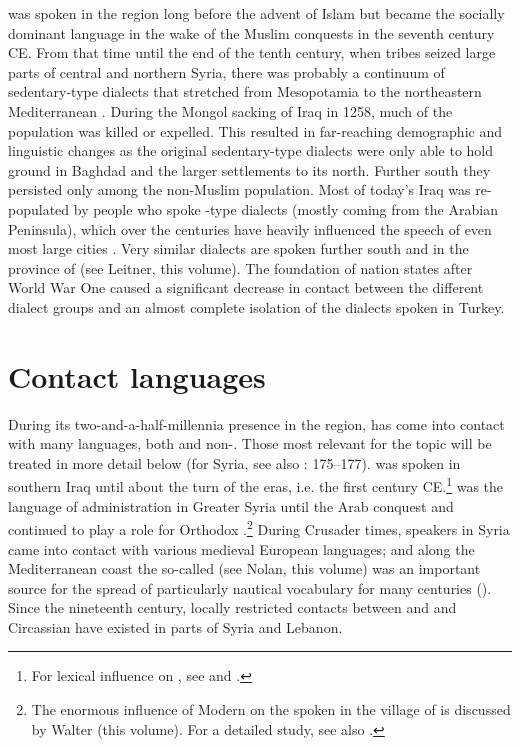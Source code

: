 \documentclass[output=paper]{langsci/langscibook}
\begin{document}
 was spoken in the region long before the advent of Islam \citep[95]{Donner1981} but became the socially dominant language in the wake of the Muslim conquests in the seventh century CE. From that time until the end of the tenth century, when  tribes seized large parts of central and northern Syria, there was probably a continuum of sedentary-type dialects that stretched from Mesopotamia to the northeastern Mediterranean \citep[291]{Procházka2018Fertile}. During the Mongol sacking of Iraq in 1258, much of the population was killed or expelled. This resulted in far-reaching demographic and linguistic changes as the original sedentary-type dialects were only able to hold ground in Baghdad and the larger settlements to its north. Further south they persisted only among the non-Muslim population. Most of today’s Iraq was re-populated by people who spoke -type dialects (mostly coming from the Arabian Peninsula), which over the centuries have heavily influenced the speech of even most large cities \citep{Holes2007}. Very similar dialects are spoken further south and in the  province of  (see Leitner, this volume). The foundation of nation states after World War One caused a significant decrease in contact between the different dialect groups and an almost complete isolation of the  dialects spoken in Turkey.

\section{Contact languages} 

During its two-and-a-half-millennia presence in the region,  has come into contact with many languages, both  and non-. Those most relevant for the topic will be treated in more detail below (for Syria, see also \citealt{Barbot1961}: 175--177).  was spoken in southern Iraq until about the turn of the eras, i.e. the first century CE.\footnote{For  lexical influence on , see \citet{Holes2002} and \citet{Krebernik2008}.}  was the language of administration in Greater Syria until the Arab conquest \citep[185--187]{Magidow2013} and continued to play a role for Orthodox .\footnote{The enormous influence of Modern  on the  spoken in the  village of  is discussed by Walter (this volume). For a detailed study, see also \citet{Borg1985}.} During Crusader times,  speakers in Syria came into contact with various medieval European languages; and along the Mediterranean coast the so-called  (see Nolan, this volume) was an important source for the spread of particularly nautical vocabulary for many centuries (\citealt{KahaneKahaneTietze1958}). Since the nineteenth century, locally restricted contacts between  and  and Circassian have existed in parts of Syria and Lebanon. 
\end{document}
